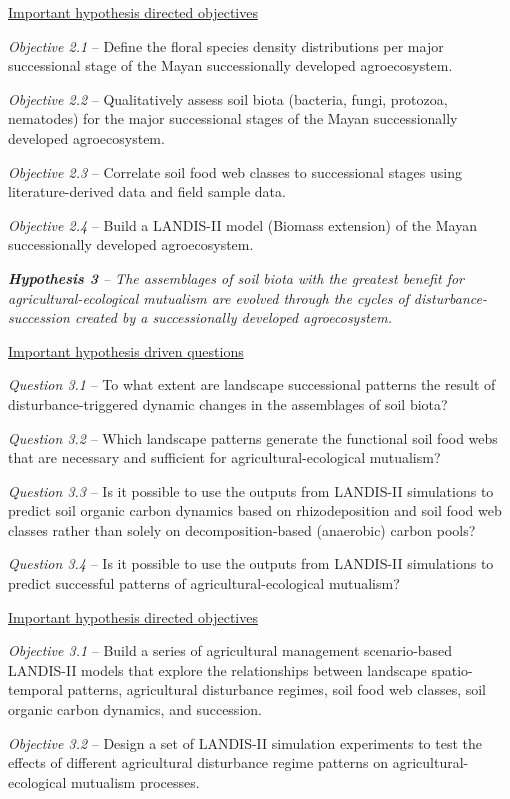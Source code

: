 \documentclass[twoside]{article}	%
\begin{document}
\begin{description}
	\underline{Important hypothesis directed objectives}
	\begin{description}
	\item{\textit{Objective 2.1} -- Define the floral species density distributions per major successional stage of the Mayan successionally developed agroecosystem.}
	\item{\textit{Objective 2.2} -- Qualitatively assess soil biota (bacteria, fungi, protozoa, nematodes) for the major successional stages of the Mayan successionally developed agroecosystem.}
	\item{\textit{Objective 2.3} -- Correlate soil food web classes to successional stages using literature-derived data and field sample data.}
	\item{\textit{Objective 2.4} -- Build a LANDIS-II model (Biomass extension) of the Mayan successionally developed agroecosystem.}
	\end{description}
	
	
	\item{\textit{\textbf{Hypothesis 3} -- The assemblages of soil biota with the greatest benefit for agricultural-ecological mutualism are evolved through the cycles of disturbance-succession created by a successionally developed agroecosystem.}}
	
	\underline{Important hypothesis driven questions}
	\begin{description}
		\item{\textit{Question 3.1} -- To what extent are landscape successional patterns the result of disturbance-triggered dynamic changes in the assemblages of soil biota?}
		\item{\textit{Question 3.2} -- Which landscape patterns generate the functional soil food webs that are necessary and sufficient for agricultural-ecological mutualism?}
		\item{\textit{Question 3.3} -- Is it possible to use the outputs from LANDIS-II simulations to predict soil organic carbon dynamics based on rhizodeposition and soil food web classes rather than solely on decomposition-based (anaerobic) carbon pools?}
		\item{\textit{Question 3.4} -- Is it possible to use the outputs from LANDIS-II simulations to predict successful patterns of agricultural-ecological mutualism?}
	\end{description}
	
	\underline{Important hypothesis directed objectives}
	\begin{description}
	\item{\textit{Objective 3.1} -- Build a series of agricultural management scenario-based LANDIS-II models that explore the relationships between landscape spatio-temporal patterns, agricultural disturbance regimes, soil food web classes, soil organic carbon dynamics, and succession.}
	\item{\textit{Objective 3.2} -- Design a set of LANDIS-II simulation experiments to test the effects of different agricultural disturbance regime patterns on agricultural-ecological mutualism processes.}	
	\end{description}

\end{description}
\end{document}
